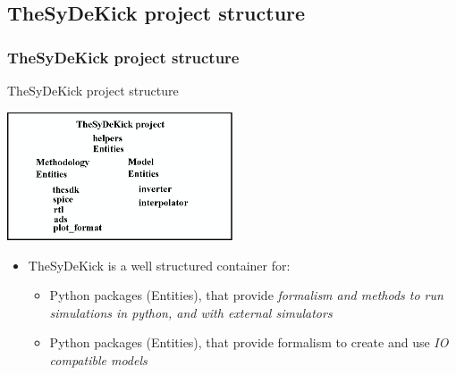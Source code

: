 \documentclass{sdkslides}
\newcommand{\sectname}{Section Name}
\begin{document}
\renewcommand{\sectname}{TheSyDeKick project structure}
\subsection*{\sectname}
\begin{frame}[t]
    \frametitle{\sectname}
    \begin{block}{TheSyDeKick project structure}
        \begin{center}
            \includegraphics[width=0.5\textwidth]{Pics/TheSyDeKick-entity-principles.eps}
        \end{center}
    \end{block}
    \begin{itemize}
        \item TheSyDeKick is a well structured container for: 
            \begin{itemize}
                \item Python packages (Entities), that provide
                    \emph{formalism and methods to run simulations in
                    python, and with external simulators}
                \item Python packages (Entities), that provide
                    formalism to create and use \emph{IO compatible models}
            \end{itemize}
    \end{itemize}
\end{frame}

\renewcommand{\sectname}{TheSyDeKick project structure}
\end{document}
